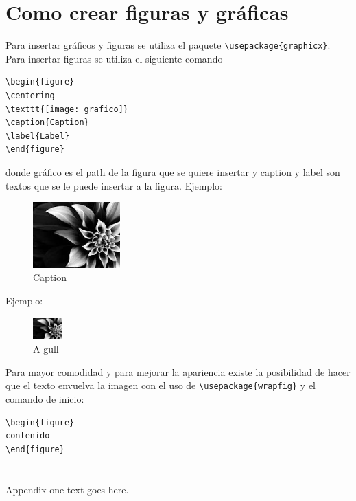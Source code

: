 \documentclass[10pt,journal,compsoc]{IEEEtran}
\begin{document}
\section{Como crear figuras y gr\'aficas}
Para insertar gr\'aficos y figuras se utiliza el paquete \verb|\usepackage{graphicx}|. Para insertar figuras se utiliza el siguiente comando
\begin{lstlisting}
\begin{figure}
\centering
\texttt{[image: grafico]}
\caption{Caption}
\label{Label}
\end{figure}
\end{lstlisting}
donde gr\'afico es el path de la figura que se quiere insertar y caption y label son textos que se le puede insertar a la figura. Ejemplo:\\
\begin{figure}
	\centering
	\includegraphics[width=0.3\textwidth]{pic1.jpg}
	\caption{Caption}
\end{figure}
Ejemplo:\\
\begin{figure}
	\begin{center}
		\includegraphics[width=0.1\textwidth]{pic1.jpg}
	\end{center}
	\caption{A gull}
\end{figure}
Para mayor comodidad y para mejorar la apariencia existe la posibilidad de hacer que el texto envuelva la imagen con el uso de \verb|\usepackage{wrapfig}| y el comando de inicio:
\begin{lstlisting}
\begin{figure}
contenido
\end{figure}
\end{lstlisting}

\appendices
\section{}
Appendix one text goes here.
\end{document}
